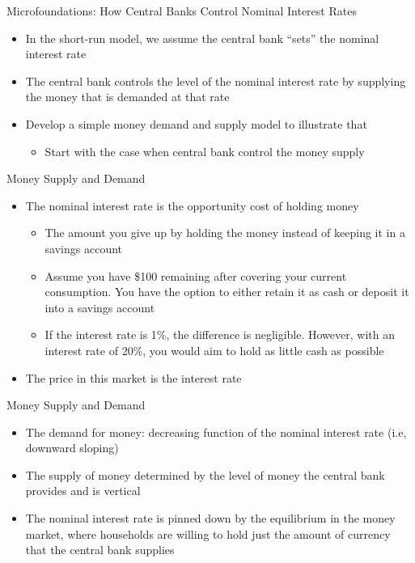 \documentclass[aspectratio=1610]{beamer}
\begin{document}
\begin{frame}[wide]{Microfoundations: How Central Banks Control Nominal Interest Rates}
	\begin{itemize}
		\item In the short-run model, we assume the central bank “sets” the nominal interest rate
		\vspace{2mm}
		\item The central bank controls the level of the nominal interest rate by supplying the money that is demanded at that rate
		\vspace{2mm}
		\item Develop a simple money demand and supply model to illustrate that 
		\vspace{1mm}
		\begin{itemize}
			\item Start with the case when central bank control the money supply
		\end{itemize}
	\end{itemize}
\end{frame}

\begin{frame}[wide]{Money Supply and Demand}
	\begin{itemize}
		\item The nominal interest rate is the opportunity cost of holding money
		\vspace{4mm}
		\begin{itemize}
			\item The amount you give up by holding the money instead of keeping it in a savings account
			\vspace{2mm}
			\item Assume you have \$100 remaining after covering your current consumption. You have the option to either retain it as cash or deposit it into a savings account
			\vspace{2mm}
			\item If the interest rate is 1\%, the difference is negligible. However, with an interest rate of 20\%, you would aim to hold as little cash as possible
		\end{itemize}
		\item The price in this market is the interest rate
	\end{itemize}
\end{frame}


\begin{frame}[wide]{Money Supply and Demand}
	\begin{itemize}
		\item The demand for money: decreasing function of the nominal interest rate (i.e, downward sloping)
		\item The supply of money determined by the level of money the central bank provides and is	vertical 
		\item The nominal interest rate is pinned down by the equilibrium in the money market, where households are willing to hold just the amount of currency that the central bank supplies
	\end{itemize}
\end{frame}
\end{document}
